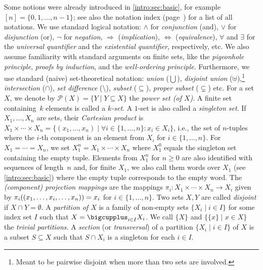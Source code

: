 
\label{def:powerset}
Some notions were already introduced in \cref{intro:sec:basic}, for example $[n] = \{0,1,\ldots,n-1\}$; see also the notation index (page~\pageref{chap:notationindex})
for a list of all notations. We use standard logical notation: $\land$ for \emph{conjunction} (and), $\lor$ for 
\emph{disjunction}  (or), $\neg$ for \emph{negation}, $\Rightarrow$ (\emph{implication}), $\Leftrightarrow$ (\emph{equivalence}), $\forall$ and $\exists$
for the \emph{universal quantifier}  and the \emph{existential quantifier}, respectively, etc. 
We also assume familiarity with standard arguments on finite sets, like
the \emph{pigeonhole principle}, \emph{proofs by induction}, and the \emph{well-ordering principle}.
Furthermore, we use standard (naive) set-theoretical notation: \emph{union} ($\bigcup$), \emph{disjoint union} ($\uplus$),\footnote{Meant to be pairwise disjoint when more than two sets are involved.}
\emph{intersection}  ($\cap$), \emph{set difference}  ($\setminus$), \emph{subset} ($\subseteq$), \emph{proper subset} ($\subsetneq$) 
etc. For a set $X$, we denote by $\mathcal P(X) = \{ Y \mid Y \subseteq X \}$
the \emph{power set (of $X$)}. 
A finite set containing~$k$ elements is called a \emph{$k$-set}. A $1$-set is also called a \emph{singleton set}. 
If $X_1, \ldots, X_n$ are sets, their \emph{Cartesian product} 
is $X_1 \times \cdots \times X_n = \{ (x_1, \ldots, x_n) \mid \forall i \in \{1,\ldots,n\} : x_i \in X_i \}$, i.e., the
set of $n$-tuples where the $i$-th component is an element from $X_i$
for $i \in \{1,\ldots,n\}$. For $X_1 = \cdots = X_n$, 
we set $X_1^n = X_1 \times \cdots \times X_n$
where $X_1^0$ equals the singleton set containing the empty tuple.
Elements from $X_1^n$ for $n \ge 0$ are also identified
with sequences of length~$n$ and, for finite $X_1$,
we also call them words over $X_1$ (see \cref{intro:sec:basic})
where the empty tuple corresponds to the empty word.
The \emph{(component) projection mappings} 
are the mappings $\pi_i \colon X_1 \times \cdots \times X_n \to X_i$
given by $\applyfunc{(x_1, \ldots, x_i, \ldots, x_n)}{\pi_i} = x_i$ for $i \in \{1,\ldots,n\}$. 
Two sets $X,Y$ are called \emph{disjoint} if $X \cap Y = \emptyset$.
A \emph{partition of $X$} is a family of non-empty sets $\{ X_i \mid i \in I \}$ for some index set $I$ 
such that $X = \bigcupplus_{i\in I} X_i$.
We call $\{X\}$ and $\{\{x\} \mid x \in X \}$ the \emph{trivial partitions}.
A \emph{section} (or \emph{transversal})
of a partition $\{ X_i \mid i \in I \}$ of $X$
is a subset $S \subseteq X$ 
such that $S \cap X_i$ is a singleton for each $i \in I$.

